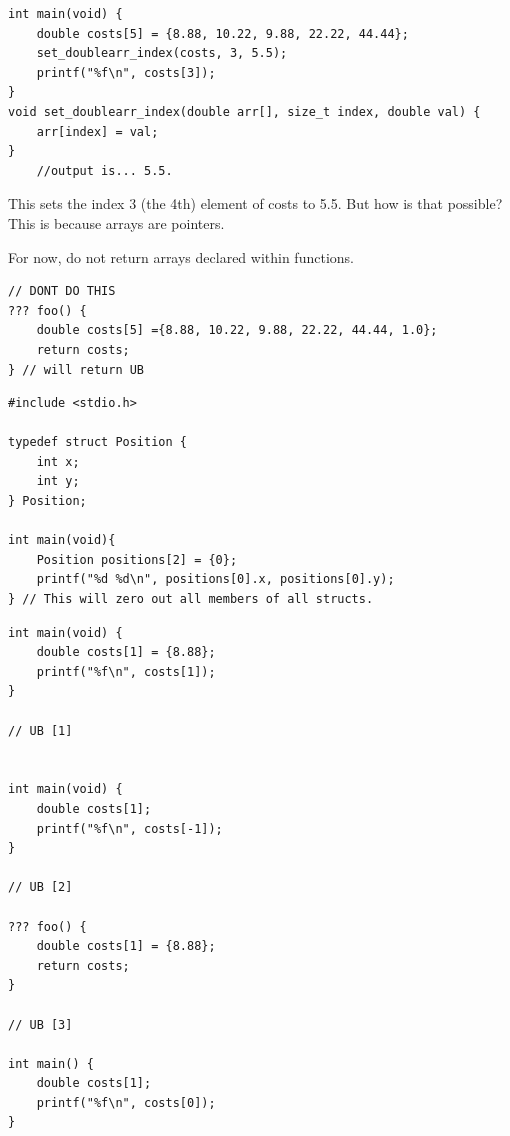 \documentclass[11pt,a4paper]{article}
\begin{document}
\label{setting-values-inside-functions}
\hypertarget{setting-values-inside-functions}{}

\begin{lstlisting}[style=cscode]
int main(void) {
    double costs[5] = {8.88, 10.22, 9.88, 22.22, 44.44};
    set_doublearr_index(costs, 3, 5.5);
    printf("%f\n", costs[3]);
}
void set_doublearr_index(double arr[], size_t index, double val) {
    arr[index] = val;
}
    //output is... 5.5.
\end{lstlisting}

This sets the index 3 (the 4th) element of costs to 5.5. But how is that possible? This is because arrays are pointers.

\label{returning-from-functions}
\hypertarget{returning-from-functions}{}

For now, do not return arrays declared within functions.

\begin{lstlisting}[style=cscode]
// DONT DO THIS
??? foo() {
    double costs[5] ={8.88, 10.22, 9.88, 22.22, 44.44, 1.0};
    return costs;
} // will return UB
\end{lstlisting}

\label{32-arrays-and-structs}
\hypertarget{32-arrays-and-structs}{}

\label{zeroing-out}
\hypertarget{zeroing-out}{}

\begin{lstlisting}[style=cscode]
#include <stdio.h>

typedef struct Position {
    int x;
    int y;
} Position;

int main(void){
    Position positions[2] = {0};
    printf("%d %d\n", positions[0].x, positions[0].y);
} // This will zero out all members of all structs.
\end{lstlisting}

\label{ub}
\hypertarget{ub}{}

\begin{lstlisting}[style=cscode]
int main(void) {
    double costs[1] = {8.88};
    printf("%f\n", costs[1]);
}

// UB [1] 


int main(void) {
    double costs[1];
    printf("%f\n", costs[-1]);
}

// UB [2]

??? foo() {
    double costs[1] = {8.88};
    return costs;
}

// UB [3]

int main() {
    double costs[1];
    printf("%f\n", costs[0]);
}
\end{lstlisting}
\end{document}
